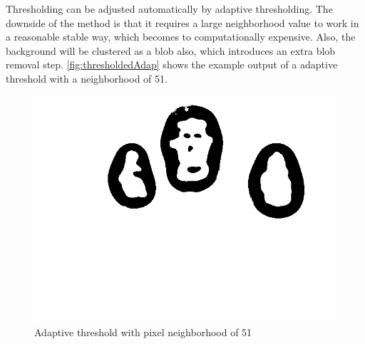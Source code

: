 Thresholding can be adjusted automatically by adaptive thresholding. The downside of the method is that it requires a large neighborhood value to work in a reasonable stable way, which becomes to computationally expensive. Also, the background will be clustered as a blob also, which introduces an extra blob removal step. \autoref{fig:thresholdedAdap} shows the example output of a adaptive threshold with a neighborhood of 51.


\begin{figure}[tb]
\center{}
\includegraphics[width=0.3\linewidth]{figures/pipeline/thresholdedAdap.jpg}
\caption{Adaptive threshold with pixel neighborhood of 51}
\label{fig:thresholdedAdap}
\end{figure}







